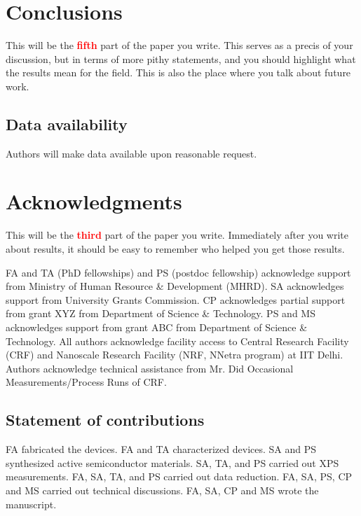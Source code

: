 \documentclass[12 pt]{article}
\begin{document}
\section{Conclusions}
\label{sec:conclusions}

This will be the \textbf{\Huge \textcolor{red}{fifth}} part of the paper you write. This serves as a precis of your discussion, but in terms of more pithy statements, and you should highlight what the results mean for the field. This is also the place where you talk about future work.

\subsection*{Data availability}

Authors will make data available upon reasonable request.

\section*{Acknowledgments}

This will be the \textbf{\Huge \textcolor{red}{third}} part of the paper you write. Immediately after you write about results, it should be easy to remember who helped you get those results.

FA and TA (PhD fellowships) and PS (postdoc fellowship) acknowledge support from Ministry of Human Resource \& Development (MHRD). SA acknowledges support from University Grants Commission. CP acknowledges partial support from grant XYZ from Department of Science \& Technology. PS and MS acknowledges support from grant ABC from Department of Science \& Technology. All authors acknowledge facility access to Central Research Facility (CRF) and Nanoscale Research Facility (NRF, NNetra program) at IIT Delhi. Authors acknowledge technical assistance from Mr. Did Occasional Measurements/Process Runs of CRF.

\subsection*{Statement of contributions}

FA fabricated the devices. FA and TA characterized devices. SA and PS synthesized active semiconductor materials. SA, TA, and PS carried out XPS measurements. FA, SA, TA, and PS carried out data reduction. FA, SA, PS, CP and MS carried out technical discussions. FA, SA, CP and MS wrote the manuscript.
\end{document}
